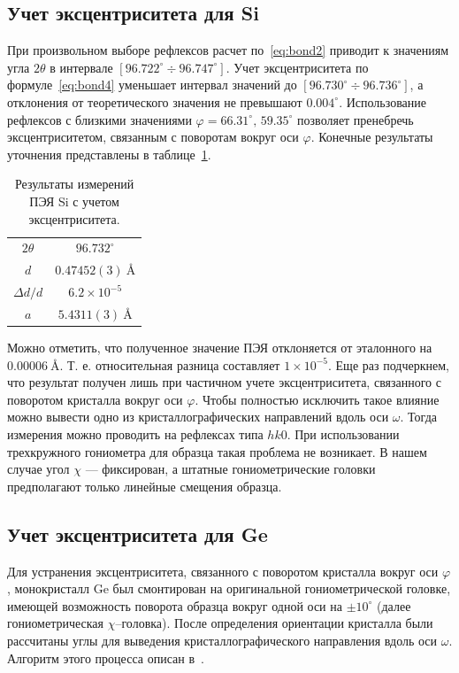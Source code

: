 \documentclass[a4paper,14pt]{extarticle}
\newcommand{\unit}[1]{ \ \text{#1}}
\newcommand{\degree}{^\circ}
\newcommand{\range}[2]{[#1\div#2]}
\begin{document}
\subsection{Учет эксцентриситета для Si}
При произвольном выборе рефлексов расчет по~\ref{eq:bond2} приводит к значениям угла $2\theta$ в интервале $\range{96.722\degree}{96.747\degree}$.
Учет эксцентриситета по формуле~\ref{eq:bond4} уменьшает интервал значений до $\range{96.730\degree}{96.736\degree}$, а отклонения от теоретического значения не превышают $0.004\degree$.
Использование рефлексов с близкими значениями $\varphi = 66.31\degree, \, 59.35\degree$ позволяет пренебречь эксцентриситетом, связанным с поворотам вокруг оси $\varphi$.
Конечные результаты уточнения представлены в таблице~\ref{tab:Si:eccentr}.
\begin{table}[ht!]
    \centering
    \begin{tabular}{ |c|c| }
        \hline
        $2\theta$ & $96.732\degree$ \\
        $d$ & $0.47452 (3)\unit{\AA}$ \\
        $\Delta d / d$ & $6.2 \times 10^{-5}$ \\
        $a$ & $5.4311 (3)\unit{\AA}$ \\
        \hline
    \end{tabular}
    \caption{Результаты измерений ПЭЯ Si с учетом эксцентриситета.}
    \label{tab:Si:eccentr}
\end{table}

Можно отметить, что полученное значение ПЭЯ отклоняется от эталонного на $0.00006\unit{\AA}$.
Т. е. относительная разница составляет $1\times 10^{-5}$.
Еще раз подчеркнем, что результат получен лишь при частичном учете эксцентриситета, связанного с поворотом кристалла вокруг оси $\varphi$.
Чтобы полностью исключить такое влияние можно вывести одно из кристаллографических направлений вдоль оси $\omega$.
Тогда измерения можно проводить на рефлексах типа $hk0$.
При использовании трехкружного гониометра для образца такая проблема не возникает.
В нашем случае угол $\chi$ --- фиксирован, а штатные гониометрические головки предполагают только линейные смещения образца.
\subsection{Учет эксцентриситета для Ge}
Для устранения эксцентриситета, связанного с поворотом кристалла вокруг оси $\varphi$, монокристалл Ge был смонтирован на оригинальной гониометрической головке, имеющей возможность поворота образца вокруг одной оси на $\pm 10\degree$ (далее гониометрическая $\chi$--головка).
После определения ориентации кристалла были рассчитаны углы для выведения кристаллографического направления вдоль оси $\omega$. Алгоритм этого процесса описан в~\cite{Kudryavtsev:2024:eccentr}.
\end{document}
